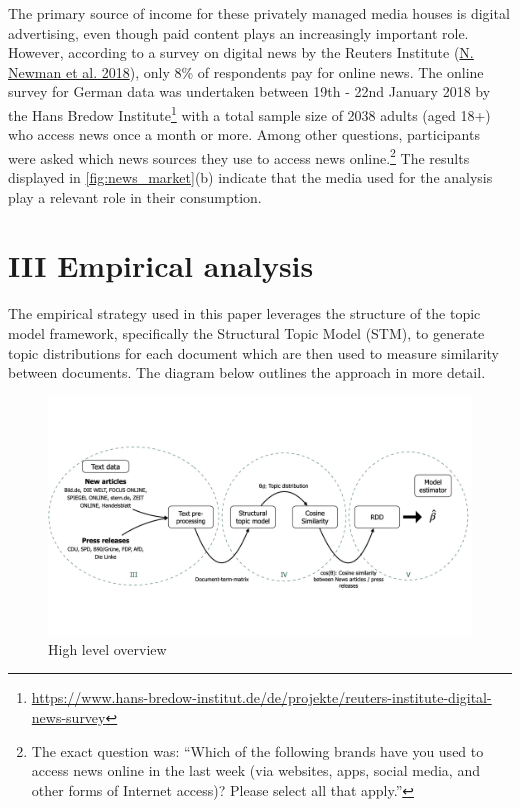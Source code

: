 \documentclass[
  12pt,
]{article}
\begin{document}
The primary source of income for these privately managed media houses is
digital advertising, even though paid content plays an increasingly
important role. However, according to a survey on digital news by the
Reuters Institute (\protect\hyperlink{ref-newman_reuters_2018}{N. Newman
et al. 2018}), only 8\% of respondents pay for online news. The online
survey for German data was undertaken between 19th - 22nd January 2018
by the Hans Bredow Institute\footnote{\url{https://www.hans-bredow-institut.de/de/projekte/reuters-institute-digital-news-survey}}
with a total sample size of 2038 adults (aged 18+) who access news once
a month or more. Among other questions, participants were asked which
news sources they use to access news online.\footnote{The exact question
  was: ``Which of the following brands have you used to access news
  online in the last week (via websites, apps, social media, and other
  forms of Internet access)? Please select all that apply.''} The
results displayed in \autoref{fig:news_market}(b) indicate that the
media used for the analysis play a relevant role in their consumption.

\hypertarget{iii-empirical-analysis}{%
\section{III Empirical analysis}\label{iii-empirical-analysis}}

The empirical strategy used in this paper leverages the structure of the
topic model framework, specifically the Structural Topic Model (STM), to
generate topic distributions for each document which are then used to
measure similarity between documents. The diagram below outlines the
approach in more detail.

\begin{figure}
\centering
\includegraphics{../figs/high_level_overview.png}
\caption{High level overview}
\end{figure}
\end{document}
